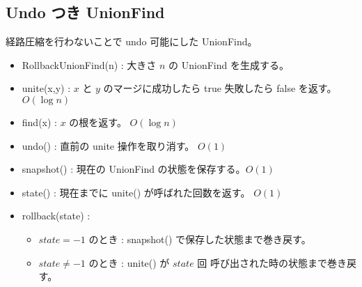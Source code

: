 \subsection{Undo つき UnionFind}

経路圧縮を行わないことで undo 可能にした UnionFind。
\begin{itemize}
    \item RollbackUnionFind(n) : 大きさ $n$ の UnionFind を生成する。
    \item unite(x,y) : $x$ と $y$ のマージに成功したら true 失敗したら false を返す。 $O(\log{n})$
    \item find(x) : $x$ の根を返す。 $O(\log{n})$
    \item undo() : 直前の unite 操作を取り消す。 $O(1)$ 
    \item snapshot() : 現在の UnionFind の状態を保存する。$O(1)$
    \item state() : 現在までに unite() が呼ばれた回数を返す。 $O(1)$
    \item rollback(state) : 
    \begin{itemize}
        \item $state = -1$ のとき : snapshot() で保存した状態まで巻き戻す。
        \item $state \neq -1$ のとき : unite() が $state$ 回 呼び出された時の状態まで巻き戻す。
    \end{itemize}
\end{itemize}

